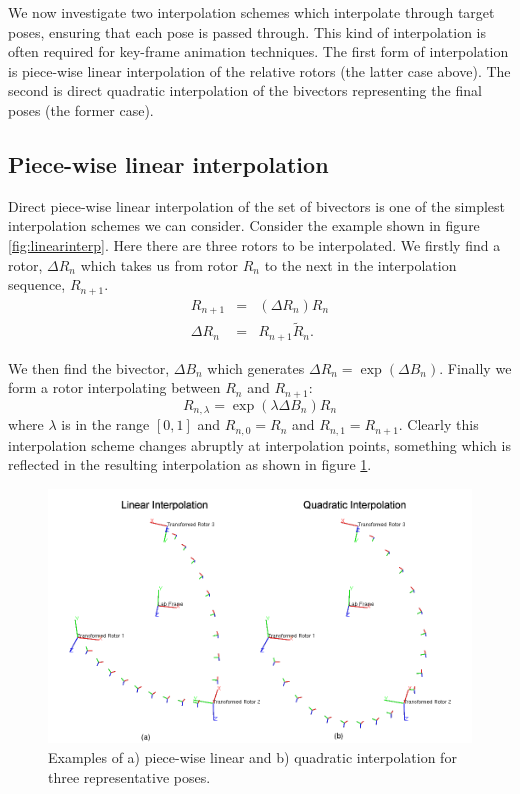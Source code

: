 We now investigate two interpolation schemes which interpolate through target
poses, ensuring that each pose is passed through. This kind of interpolation is
often required for key-frame animation techniques. The first form of
interpolation is piece-wise linear interpolation of the relative rotors (the
		latter case above). The second is direct quadratic
interpolation of the bivectors representing the final poses (the former case).


\subsection{Piece-wise linear interpolation}

Direct piece-wise linear interpolation of the set of bivectors is one of the simplest interpolation
schemes we can consider. Consider the example shown in figure \ref{fig:linearinterp}. Here there are
three rotors to be interpolated. We firstly find a rotor, $\Delta R_n$ which takes us from 
rotor $R_n$ to the next in the interpolation sequence, $R_{n+1}$.
\begin{eqnarray*}
R_{n+1} & = & (\Delta R_n) R_n\\
\Delta R_n & = & R_{n+1} \tilde{R}_n.
\end{eqnarray*}

We then find the bivector, $\Delta B_n$ which generates $\Delta R_n = \exp(\Delta B_n)$. Finally we
form a rotor interpolating between $R_n$  and $R_{n+1}$:
\[
R_{n,\lambda} = \exp(\lambda \Delta B_n)R_n
\]
where $\lambda$ is in the range $[0,1]$ and $R_{n,0} = R_n$ and $R_{n,1} = R_{n+1}$.
Clearly this interpolation scheme changes abruptly at interpolation points, something which is
reflected in the resulting interpolation as shown in figure \ref{fig:interp}.

\begin{figure}\centering
\includegraphics[width=\columnwidth]{interp}
\caption{\label{fig:interp}Examples of a) piece-wise linear and b) quadratic interpolation for
three representative poses.}
\end{figure}


